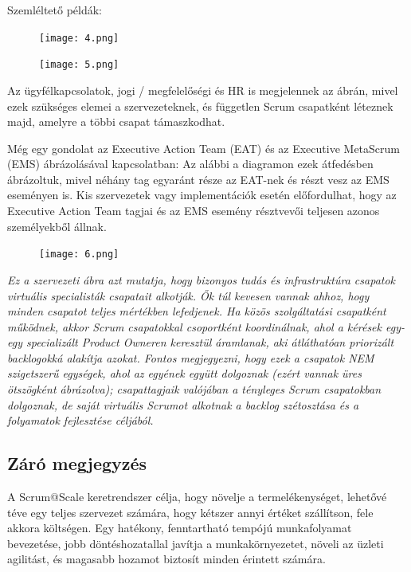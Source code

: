 \documentclass[12pt,a4paper,parskip=full]{scrartcl}
\begin{document}
Szemléltető példák:

\begin{figure}[H]
    \centering
    \texttt{[image: 4.png]}
\end{figure}

\begin{figure}[H]
    \centering
    \texttt{[image: 5.png]}
\end{figure}

Az ügyfélkapcsolatok, jogi / megfelelőségi és HR is megjelennek az ábrán, mivel ezek szükséges elemei a szervezeteknek, és független Scrum csapatként léteznek majd, amelyre a többi csapat támaszkodhat.

Még egy gondolat az Executive Action Team (EAT) és az Executive MetaScrum (EMS) ábrázolásával kapcsolatban: Az alábbi a diagramon ezek átfedésben ábrázoltuk, mivel néhány tag egyaránt része az EAT-nek és részt vesz az EMS eseményen is. Kis szervezetek vagy implementációk esetén előfordulhat, hogy az Executive Action Team tagjai és az EMS esemény résztvevői teljesen azonos személyekből állnak.

\begin{figure}[H]
    \centering
    \texttt{[image: 6.png]}
\end{figure}


\emph{
Ez a szervezeti ábra azt mutatja, hogy bizonyos tudás és infrastruktúra csapatok virtuális specialisták csapatait alkotják. Ők túl kevesen vannak ahhoz, hogy minden csapatot teljes mértékben lefedjenek. Ha közös szolgáltatási csapatként működnek, akkor Scrum csapatokkal csoportként koordinálnak, ahol a kérések egy-egy specializált Product Owneren keresztül áramlanak, aki átláthatóan priorizált backlogokká alakítja azokat. Fontos megjegyezni, hogy ezek a csapatok NEM szigetszerű egységek, ahol az egyének együtt dolgoznak (ezért vannak üres ötszögként ábrázolva); csapattagjaik valójában a tényleges Scrum csapatokban dolgoznak, de saját virtuális Scrumot alkotnak a backlog szétosztása és a folyamatok fejlesztése céljából.
}

\subsection{Záró megjegyzés}\label{End-Note}

A Scrum@Scale keretrendszer célja, hogy növelje a termelékenységet, lehetővé téve egy teljes szervezet számára, hogy kétszer annyi értéket szállítson, fele akkora költségen. Egy hatékony, fenntartható tempójú munkafolyamat bevezetése, jobb döntéshozatallal javítja a munkakörnyezetet, növeli az üzleti agilitást, és magasabb hozamot biztosít minden érintett számára.
\end{document}
